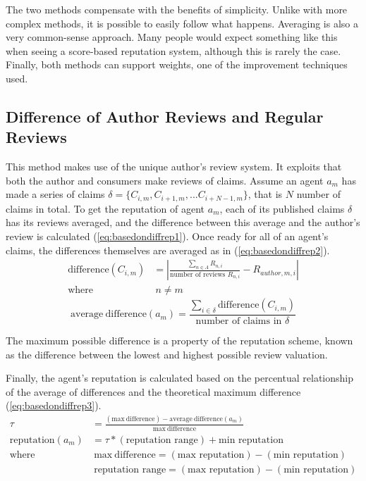 \documentclass[%
    ]{\PathToTumTemplate/thesis/tum_thesis}
\begin{document}
The two methods compensate with the benefits of simplicity.
Unlike with more complex methods, it is possible to easily follow what happens.
Averaging is also a very common-sense approach.
Many people would expect something like this when seeing a score-based reputation system, although this is rarely the case.
Finally, both methods can support weights, one of the improvement techniques used.

\subsection{Difference of Author Reviews and Regular Reviews}\label{sec:approac_repcalc_basedondifference}
This method makes use of the unique author's review system.
It exploits that both the author and consumers make reviews of claims.
Assume an agent $a_m$ has made a series of claims $\delta=\{C_{i,m}, C_{i+1,m},...C_{i+N-1,m}\}$, that is $N$ number of claims in total.
To get the reputation of agent $a_m$, each of its published claims $\delta$ has its reviews averaged, and the difference between this average and the author's review is calculated (\ref{eq:basedondiffrep1}). Once ready for all of an agent's claims, the differences themselves are averaged as in (\ref{eq:basedondiffrep2}).
\begin{equation} \label{eq:basedondiffrep1}
\begin{aligned}
\mathrm{difference}(C_{i,m})&=\left|\frac{\sum_{n \in A} R_{n,i}}{\text{number of reviews }R_{n,i}}-R_{author,m,i}\right| \\
\text{where}&~ n\neq m
\end{aligned}
\end{equation}
\begin{equation} \label{eq:basedondiffrep2}
\mathrm{average~difference}(a_m)=\frac{\sum_{i\in\delta}\mathrm{difference}(C_{i,m})}{\text{number of claims in }\delta}
\end{equation}

The maximum possible difference is a property of the reputation scheme, known as the difference between the lowest and highest possible review valuation.

Finally, the agent's reputation is calculated based on the percentual relationship of the average of differences and the theoretical maximum difference (\ref{eq:basedondiffrep3}).
\begin{equation} \label{eq:basedondiffrep3}
\begin{aligned}
\tau &=\frac{(\mathrm{max~difference})-\mathrm{average~difference}(a_m)}{\mathrm{max~difference}} \\
\mathrm{reputation}(a_m)&=\tau*(\text{reputation range})+\text{min reputation} \\
\text{where}&~ \mathrm{max~difference}=(\text{max reputation})-(\text{min reputation}) \\
&~ \text{reputation range}=(\text{max reputation})-(\text{min reputation})
\end{aligned}
\end{equation}
\end{document}
